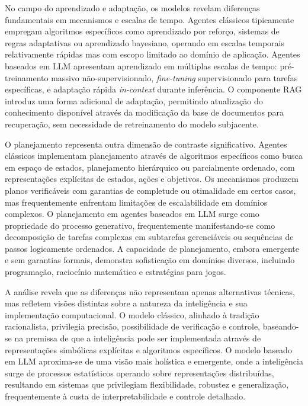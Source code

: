 \documentclass[12pt]{article}
\begin{document}
No campo do aprendizado e adaptação, os modelos revelam diferenças fundamentais em mecanismos e escalas de tempo. Agentes clássicos tipicamente empregam algoritmos específicos como aprendizado por reforço, sistemas de regras adaptativas ou aprendizado bayesiano, operando em escalas temporais relativamente rápidas mas com escopo limitado ao domínio de aplicação. Agentes baseados em LLM apresentam aprendizado em múltiplas escalas de tempo: pré-treinamento massivo não-supervisionado, \textit{fine-tuning} supervisionado para tarefas específicas, e adaptação rápida \textit{in-context} durante inferência. O componente RAG introduz uma forma adicional de adaptação, permitindo atualização do conhecimento disponível através da modificação da base de documentos para recuperação, sem necessidade de retreinamento do modelo subjacente.

O planejamento representa outra dimensão de contraste significativo. Agentes clássicos implementam planejamento através de algoritmos específicos como busca em espaço de estados, planejamento hierárquico ou parcialmente ordenado, com representações explícitas de estados, ações e objetivos. Os mecanismos produzem planos verificáveis com garantias de completude ou otimalidade em certos casos, mas frequentemente enfrentam limitações de escalabilidade em domínios complexos. O planejamento em agentes baseados em LLM surge como propriedade do processo generativo, frequentemente manifestando-se como decomposição de tarefas complexas em subtarefas gerenciáveis ou sequências de passos logicamente ordenados. A capacidade de planejamento, embora emergente e sem garantias formais, demonstra sofisticação em domínios diversos, incluindo programação, raciocínio matemático e estratégias para jogos.

A análise revela que as diferenças não representam apenas alternativas técnicas, mas refletem visões distintas sobre a natureza da inteligência e sua implementação computacional. O modelo clássico, alinhado à tradição racionalista, privilegia precisão, possibilidade de verificação e controle, baseando-se na premissa de que a inteligência pode ser implementada através de representações simbólicas explícitas e algoritmos específicos. O modelo baseado em LLM aproxima-se de uma visão mais holística e emergente, onde a inteligência surge de processos estatísticos operando sobre representações distribuídas, resultando em sistemas que privilegiam flexibilidade, robustez e generalização, frequentemente à custa de interpretabilidade e controle detalhado.
\end{document}
